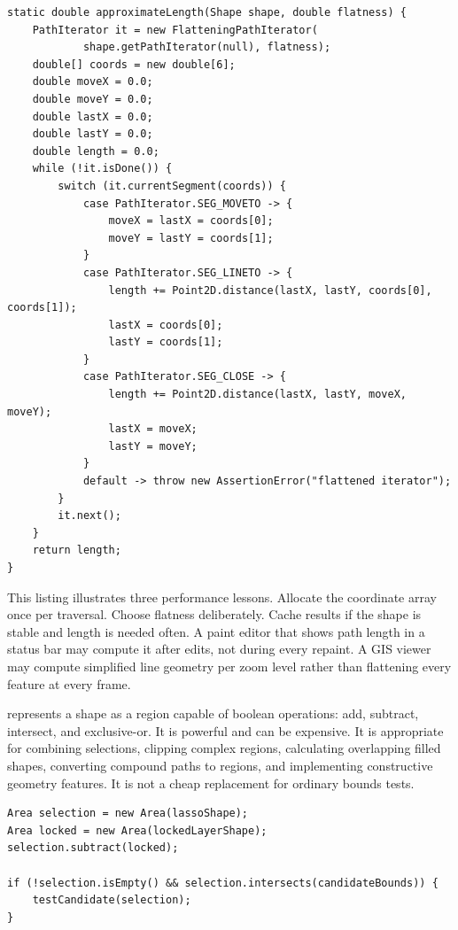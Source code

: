 \begin{lstlisting}[caption={Computing a rough path length with a flattening iterator.}]
static double approximateLength(Shape shape, double flatness) {
    PathIterator it = new FlatteningPathIterator(
            shape.getPathIterator(null), flatness);
    double[] coords = new double[6];
    double moveX = 0.0;
    double moveY = 0.0;
    double lastX = 0.0;
    double lastY = 0.0;
    double length = 0.0;
    while (!it.isDone()) {
        switch (it.currentSegment(coords)) {
            case PathIterator.SEG_MOVETO -> {
                moveX = lastX = coords[0];
                moveY = lastY = coords[1];
            }
            case PathIterator.SEG_LINETO -> {
                length += Point2D.distance(lastX, lastY, coords[0], coords[1]);
                lastX = coords[0];
                lastY = coords[1];
            }
            case PathIterator.SEG_CLOSE -> {
                length += Point2D.distance(lastX, lastY, moveX, moveY);
                lastX = moveX;
                lastY = moveY;
            }
            default -> throw new AssertionError("flattened iterator");
        }
        it.next();
    }
    return length;
}
\end{lstlisting}

This listing illustrates three performance lessons. Allocate the coordinate array once per traversal. Choose flatness deliberately. Cache results if the shape is stable and length is needed often. A paint editor that shows path length in a status bar may compute it after edits, not during every repaint. A GIS viewer may compute simplified line geometry per zoom level rather than flattening every feature at every frame.

 represents a shape as a region capable of boolean operations: add, subtract, intersect, and exclusive-or. It is powerful and can be expensive. It is appropriate for combining selections, clipping complex regions, calculating overlapping filled shapes, converting compound paths to regions, and implementing constructive geometry features. It is not a cheap replacement for ordinary bounds tests.

\begin{lstlisting}[caption={Boolean geometry for a selection region.}]
Area selection = new Area(lassoShape);
Area locked = new Area(lockedLayerShape);
selection.subtract(locked);

if (!selection.isEmpty() && selection.intersects(candidateBounds)) {
    testCandidate(selection);
}
\end{lstlisting}

